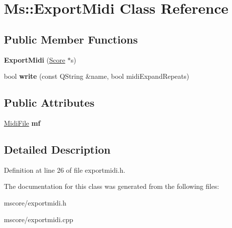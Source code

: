 \hypertarget{class_ms_1_1_export_midi}{}\section{Ms\+:\+:Export\+Midi Class Reference}
\label{class_ms_1_1_export_midi}
\subsection*{Public Member Functions}
\begin{DoxyCompactItemize}
\item 
\mbox{\label{class_ms_1_1_export_midi_aa3b975b45ddec9a006d0ee079e741be5}} 
{\bfseries Export\+Midi} (\hyperlink{class_ms_1_1_score}{Score} $\ast$s)
\item 
\mbox{\label{class_ms_1_1_export_midi_a3d00371e1c505932c6786e3a8526637a}} 
bool {\bfseries write} (const Q\+String \&name, bool midi\+Expand\+Repeats)
\end{DoxyCompactItemize}
\subsection*{Public Attributes}
\begin{DoxyCompactItemize}
\item 
\mbox{\label{class_ms_1_1_export_midi_a830bfee9d8b9b3b105aff29eb8cd80d4}} 
\hyperlink{class_ms_1_1_midi_file}{Midi\+File} {\bfseries mf}
\end{DoxyCompactItemize}


\subsection{Detailed Description}


Definition at line 26 of file exportmidi.\+h.



The documentation for this class was generated from the following files\+:\begin{DoxyCompactItemize}
\item 
mscore/exportmidi.\+h\item 
mscore/exportmidi.\+cpp\end{DoxyCompactItemize}
